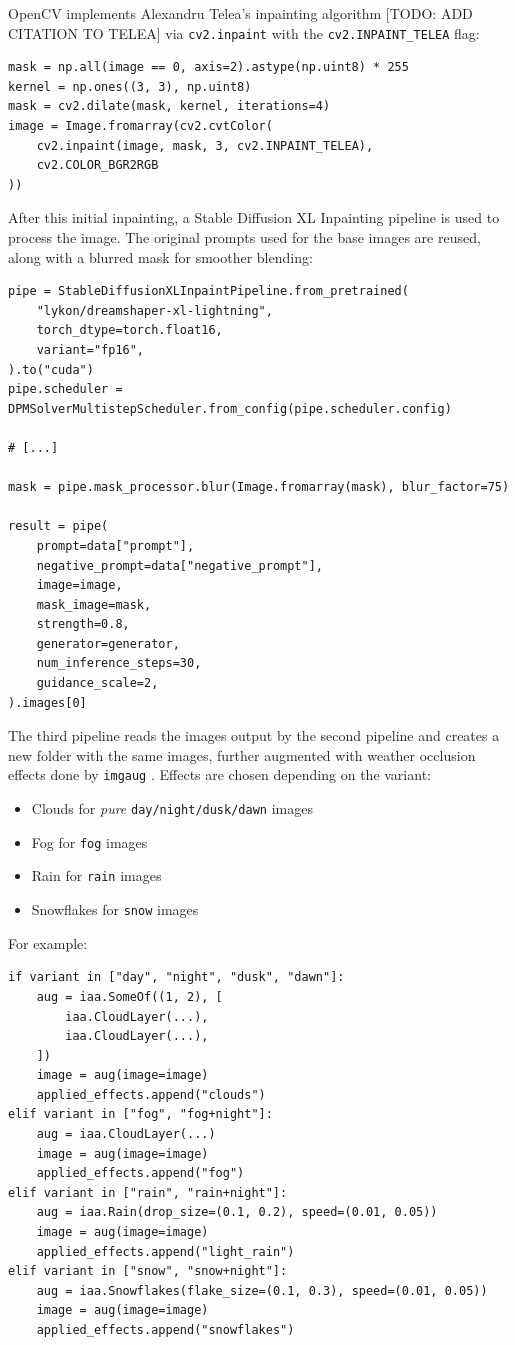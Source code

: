 OpenCV implements Alexandru Telea's inpainting algorithm [TODO: ADD CITATION TO
TELEA] via \texttt{cv2.inpaint} with the \texttt{cv2.INPAINT\_TELEA} flag:

\begin{lstlisting}
mask = np.all(image == 0, axis=2).astype(np.uint8) * 255
kernel = np.ones((3, 3), np.uint8)
mask = cv2.dilate(mask, kernel, iterations=4)
image = Image.fromarray(cv2.cvtColor(
    cv2.inpaint(image, mask, 3, cv2.INPAINT_TELEA),
    cv2.COLOR_BGR2RGB
))
\end{lstlisting}

After this initial inpainting, a Stable Diffusion XL Inpainting pipeline is used to process the image. 
The original prompts used for the base images are reused, along with a blurred mask for smoother blending:

\begin{lstlisting}
pipe = StableDiffusionXLInpaintPipeline.from_pretrained(
    "lykon/dreamshaper-xl-lightning",
    torch_dtype=torch.float16,
    variant="fp16",
).to("cuda")
pipe.scheduler = DPMSolverMultistepScheduler.from_config(pipe.scheduler.config)

# [...]

mask = pipe.mask_processor.blur(Image.fromarray(mask), blur_factor=75)

result = pipe(
    prompt=data["prompt"],
    negative_prompt=data["negative_prompt"],
    image=image,
    mask_image=mask,
    strength=0.8,
    generator=generator,
    num_inference_steps=30,
    guidance_scale=2,
).images[0]
\end{lstlisting}

The third pipeline reads the images output by the second pipeline and creates a new folder with the same images, further augmented with weather occlusion effects done by \texttt{imgaug} \cite{???}. 
Effects are chosen depending on the variant:

\begin{itemize}
\item Clouds for \emph{pure} \texttt{day/night/dusk/dawn} images
\item Fog for \texttt{fog} images
\item Rain for \texttt{rain} images
\item Snowflakes for \texttt{snow} images
\end{itemize}

For example:

\begin{lstlisting}
if variant in ["day", "night", "dusk", "dawn"]:
    aug = iaa.SomeOf((1, 2), [
        iaa.CloudLayer(...),
        iaa.CloudLayer(...),
    ])
    image = aug(image=image)
    applied_effects.append("clouds")
elif variant in ["fog", "fog+night"]:
    aug = iaa.CloudLayer(...)
    image = aug(image=image)
    applied_effects.append("fog")
elif variant in ["rain", "rain+night"]:
    aug = iaa.Rain(drop_size=(0.1, 0.2), speed=(0.01, 0.05))
    image = aug(image=image)
    applied_effects.append("light_rain")
elif variant in ["snow", "snow+night"]:
    aug = iaa.Snowflakes(flake_size=(0.1, 0.3), speed=(0.01, 0.05))
    image = aug(image=image)
    applied_effects.append("snowflakes")
\end{lstlisting}

